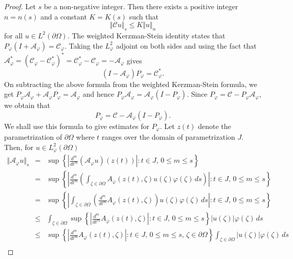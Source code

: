 \documentclass[11pt, reqno]{amsart}
\numberwithin{equation}{section}
\begin{document}
\begin{proof}
Let $s$ be a non-negative integer. Then there exists a positive integer $n=n(s)$ and a constant $K=K(s)$ such that
\[
\Vert \mathcal{C}u\Vert_s\leq K\Vert u\Vert_n
\]
for all $u\in L^2(\partial \Omega)$. The weighted Kerzman-Stein identity states that $P_{\varphi}(I+\mathcal{A}_{\varphi})=\mathcal{C}_{\varphi}$. Taking the $L^2_{\varphi}$ adjoint on both sides and using the fact that $\mathcal{A}_{\varphi}^{*}=(\mathcal{C}_{\varphi}-\mathcal{C}^*_{\varphi})^{*}=\mathcal{C}^*_{\varphi}-\mathcal{C}_{\varphi}=-\mathcal{A}_{\varphi}$ gives 
\[
(I-\mathcal{A}_{\varphi})P_{\varphi}=\mathcal{C}^*_{\varphi}.
\]
On subtracting the above formula from the weighted Kerzman-Stein formula, we get $P_{\varphi}\mathcal{A}_{\varphi}+\mathcal{A}_{\varphi}P_{\varphi}=\mathcal{A}_{\varphi}$ and hence $P_{\varphi}\mathcal{A}_{\varphi}=\mathcal{A}_{\varphi}(I-P_{\varphi})$. Since $P_{\varphi}=\mathcal{C}-P_{\varphi}\mathcal{A}_{\varphi}$, we obtain that
\begin{equation}\label{KS eqn}
    P_{\varphi}=\mathcal{C}-\mathcal{A}_{\varphi}(I-P_{\varphi}).
\end{equation}
We shall use this formula to give estimates for $P_{\varphi}$.
Let $z(t)$ denote the parametrization of $\partial\Omega$ where $t$ ranges over the domain of parametrization $J$. Then, for $u\in L^2_{\varphi}(\partial\Omega)$
\begin{eqnarray*}
\Vert \mathcal{A}_{\varphi}u\Vert_s
&=&
\sup\left\lbrace\left\lvert\frac{d^m}{dt^m}(\mathcal{A}_{\varphi}u)(z(t))\right\rvert : t\in J,\,0\leq m\leq s\right\rbrace\\
&=&
\sup\left\lbrace\left\lvert \frac{d^m}{dt^m}\left(\int_{\zeta\in\partial\Omega} A_{\varphi}(z(t),\zeta) u(\zeta)\varphi(\zeta)\,ds\right)\right\rvert: t\in J,\,0\leq m\leq s\right\rbrace\\
&=&
\sup\left\lbrace\left\lvert\int_{\zeta\in\partial\Omega} \left(\frac{d^m}{dt^m} A_{\varphi}(z(t),\zeta)\right) u(\zeta)\varphi(\zeta)\,ds\right\rvert:t\in J,\,0\leq m\leq s\right\rbrace\\
&\leq&
\int_{\zeta\in\partial\Omega} \sup\left\lbrace\left\lvert \frac{d^m}{dt^m} A_{\varphi}(z(t),\zeta) \right\rvert:t\in J,\,0\leq m\leq s\right\rbrace \vert u(\zeta)\vert\varphi(\zeta)\,ds\\
&\leq&
\sup\left\lbrace\left\lvert \frac{d^m}{dt^m} A_{\varphi}(z(t),\zeta) \right\rvert:t\in J,\,0\leq m\leq s,\,\zeta\in\partial\Omega\right\rbrace\int_{\zeta\in\partial\Omega}\vert u(\zeta)\vert \varphi(\zeta)\,ds\\

\end{eqnarray*}
\end{proof}
\end{document}
